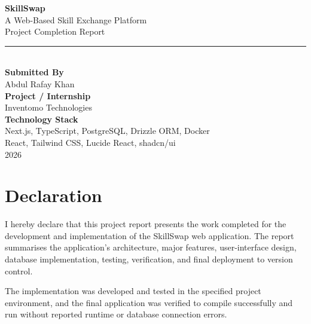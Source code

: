 \documentclass[12pt,a4paper]{report}
\begin{document}
\begin{titlepage}
\centering
\vspace*{2cm}

{\Huge\bfseries\color{skillpurple} SkillSwap}\\[0.6cm]
{\LARGE A Web-Based Skill Exchange Platform}\\[1.2cm]
{\Large Project Completion Report}\\[2cm]

\rule{\textwidth}{1.5pt}\\[1.5cm]

{\Large\textbf{Submitted By}}\\[0.4cm]
{\Large Abdul Rafay Khan}\\[1cm]

{\Large\textbf{Project / Internship}}\\[0.4cm]
{\Large Inventomo Technologies}\\[1cm]

{\Large\textbf{Technology Stack}}\\[0.4cm]
{\large Next.js, TypeScript, PostgreSQL, Drizzle ORM, Docker}\\[0.3cm]
{\large React, Tailwind CSS, Lucide React, shadcn/ui}\\[2cm]

{\Large 2026}

\vfill
\end{titlepage}

\chapter*{Declaration}

I hereby declare that this project report presents the work completed for the
development and implementation of the SkillSwap web application.  The report
summarises the application's architecture, major features, user-interface design,
database implementation, testing, verification, and final deployment to version
control.

The implementation was developed and tested in the specified project environment,
and the final application was verified to compile successfully and run without
reported runtime or database connection errors.
\end{document}
